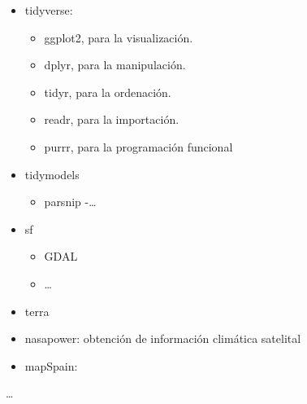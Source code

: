 \documentclass[12pt,a4paper,]{book}
\providecommand{\tightlist}{%
  \setlength{\itemsep}{0pt}\setlength{\parskip}{0pt}}
\numberwithin{dummy}{section}
\theoremstyle{ocrenumbox}
\theoremstyle{blacknumex}
\theoremstyle{blacknumbox}
\theoremstyle{ocrenum}
\theoremstyle{ocrenum}
\begin{document}
\begin{itemize}
\item
  tidyverse:

  \begin{itemize}
  \tightlist
  \item
    ggplot2, para la visualización.
  \item
    dplyr, para la manipulación.
  \item
    tidyr, para la ordenación.
  \item
    readr, para la importación.
  \item
    purrr, para la programación funcional
  \end{itemize}
\item
  tidymodels

  \begin{itemize}
  \tightlist
  \item
    parsnip -\ldots{}
  \end{itemize}
\item
  sf

  \begin{itemize}
  \tightlist
  \item
    GDAL
  \item
    \ldots{}
  \end{itemize}
\item
  terra
\item
  nasapower: obtención de información climática satelital
\item
  mapSpain:
\end{itemize}

\ldots{}




%
\end{document}
